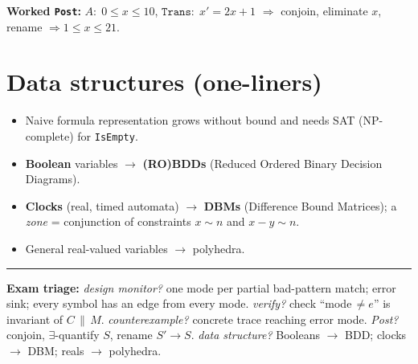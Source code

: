 \textbf{Worked \texttt{Post}:} $A:\;0\le x\le 10$, $\texttt{Trans}:\;x'=2x+1$ $\Rightarrow$ conjoin, eliminate $x$, rename $\Rightarrow \boxed{1\le x\le 21}$.

\section{Data structures (one-liners)}
\begin{itemize}
  \item Naive formula representation grows without bound and needs SAT (NP-complete) for \texttt{IsEmpty}.
  \item \textbf{Boolean} variables $\to$ \textbf{(RO)BDDs} (Reduced Ordered Binary Decision Diagrams).
  \item \textbf{Clocks} (real, timed automata) $\to$ \textbf{DBMs} (Difference Bound Matrices); a \emph{zone} = conjunction of constraints $x\sim n$ and $x-y\sim n$.
  \item General real-valued variables $\to$ polyhedra.
\end{itemize}

\vspace{4pt}
\hrule
\vspace{2pt}
{\footnotesize\textbf{Exam triage:} \emph{design monitor?} one mode per partial bad-pattern match; error sink; every symbol has an edge from every mode. \emph{verify?} check ``mode$\,\neq e$'' is invariant of $C\,\|\,M$. \emph{counterexample?} concrete trace reaching error mode. \emph{Post?} conjoin, $\exists$-quantify $S$, rename $S'{\to}S$. \emph{data structure?} Booleans $\to$ BDD; clocks $\to$ DBM; reals $\to$ polyhedra.}
